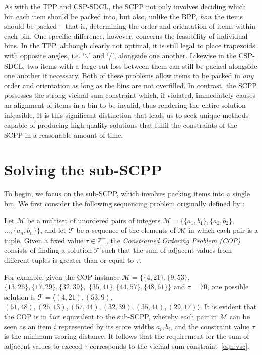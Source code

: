 \documentclass[a4paper,11pt,authoryear]{elsarticle}
\begin{document}
As with the TPP and CSP-SDCL, the SCPP not only involves deciding which bin each item should be packed into, but also, unlike the BPP, \emph{how} the items should be packed -- that is, determining the order and orientation of items within each bin. One specific difference, however, concerns the feasibility of individual bins. In the TPP, although clearly not optimal, it is still legal to place trapezoids with opposite angles, i.e. `$\backslash$' and `/', alongside one another. Likewise in the CSP-SDCL, two items with a large cut loss between them can still be packed alongside one another if necessary. Both of these problems allow items to be packed in \emph{any} order and orientation as long as the bins are not overfilled. In contrast, the SCPP possesses the strong vicinal sum constraint which, if violated, immediately causes an alignment of items in a bin to be invalid, thus rendering the entire solution infeasible. It is this significant distinction that leads us to seek unique methods capable of producing high quality solutions that fulfil the constraints of the SCPP in a reasonable amount of time.

\section{Solving the sub-SCPP}
\label{sec:ahc}
\noindent To begin, we focus on the sub-SCPP, which involves packing items into a single bin. We first consider the following sequencing problem originally defined by \cite{hawa2018}:

\begin{definition} %
	Let $\mathcal{M}$ be a multiset of unordered pairs of integers $\mathcal{M} = \{\{a_1, b_1\}, \{a_2, b_2\},$ $\dotsc,\{a_n, b_n\}\}$, and let $\mathcal{T}$ be a sequence of the elements of $\mathcal{M}$ in which each pair is a tuple. Given a fixed value $\tau \in \mathbb{Z}^+$, the \emph{Constrained Ordering Problem (COP)} consists of finding a solution $\mathcal{T}$ such that the sum of adjacent values from different tuples is greater than or equal to $\tau$.
	\label{defn:cop}
\end{definition}

\noindent For example, given the COP instance $\mathcal{M} = \{\{4,21\}, \{9,53\},$ $\{13,26\}, \{17,29\}, \{32,39\},$ $\{35,41\}, \{44,57\}, \{48,61\} \}$ and $\tau = 70$, one possible solution is $\mathcal{T} = \langle(4,21), (53,9),$ $(61,48), (26,13), (57,44), (32,39), (35,41), (29,17)\rangle$. It is evident that the COP is in fact equivalent to the sub-SCPP, whereby each pair in $\mathcal{M}$ can be seen as an item $i$ represented by its score widths $a_i, b_i$, and the constraint value $\tau$ is the minimum scoring distance. It follows that the requirement for the sum of adjacent values to exceed $\tau$ corresponds to the vicinal sum constraint~\eqref{eqn:vsc}.
\end{document}
